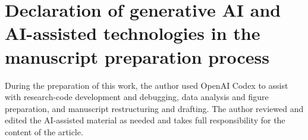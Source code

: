 \documentclass[a4paper,fleqn]{cas-sc}
\begin{document}
\section*{Declaration of generative AI and AI-assisted technologies in the manuscript preparation process}
During the preparation of this work, the author used OpenAI Codex to assist with research-code development and debugging, data analysis and figure preparation, and manuscript restructuring and drafting. The author reviewed and edited the AI-assisted material as needed and takes full responsibility for the content of the article.

\footnotesize
\setlength{\bibsep}{0pt}


\end{document}
